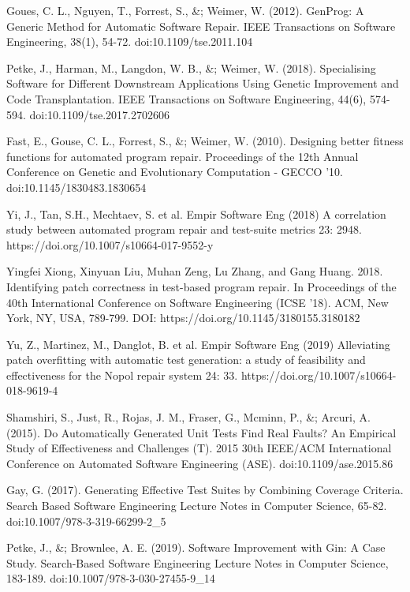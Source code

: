 \documentclass[titlepage]{article}
\begin{document}
\begin{thebibliography}{99}
Goues, C. L., Nguyen, T., Forrest, S., \&; Weimer, W. (2012). GenProg: A Generic Method for Automatic Software Repair. IEEE Transactions on Software Engineering, 38(1), 54-72. doi:10.1109/tse.2011.104

Petke, J., Harman, M., Langdon, W. B., \&; Weimer, W. (2018). Specialising Software for Different Downstream Applications Using Genetic Improvement and Code Transplantation. IEEE Transactions on Software Engineering, 44(6), 574-594. doi:10.1109/tse.2017.2702606

Fast, E., Gouse, C. L., Forrest, S., \&; Weimer, W. (2010). Designing better fitness functions for automated program repair. Proceedings of the 12th Annual Conference on Genetic and Evolutionary Computation - GECCO '10. doi:10.1145/1830483.1830654

Yi, J., Tan, S.H., Mechtaev, S. et al. Empir Software Eng (2018) A correlation study between automated program repair and test-suite metrics 23: 2948. https://doi.org/10.1007/s10664-017-9552-y

Yingfei Xiong, Xinyuan Liu, Muhan Zeng, Lu Zhang, and Gang Huang. 2018. Identifying patch correctness in test-based program repair. In Proceedings of the 40th International Conference on Software Engineering (ICSE '18). ACM, New York, NY, USA, 789-799. DOI: https://doi.org/10.1145/3180155.3180182

Yu, Z., Martinez, M., Danglot, B. et al. Empir Software Eng (2019) Alleviating patch overfitting with automatic test generation: a study of feasibility and effectiveness for the Nopol repair system 24: 33. https://doi.org/10.1007/s10664-018-9619-4

Shamshiri, S., Just, R., Rojas, J. M., Fraser, G., Mcminn, P., \&; Arcuri, A. (2015). Do Automatically Generated Unit Tests Find Real Faults? An Empirical Study of Effectiveness and Challenges (T). 2015 30th IEEE/ACM International Conference on Automated Software Engineering (ASE). doi:10.1109/ase.2015.86

Gay, G. (2017). Generating Effective Test Suites by Combining Coverage Criteria. Search Based Software Engineering Lecture Notes in Computer Science, 65-82. doi:10.1007/978-3-319-66299-2\_5

Petke, J., \&; Brownlee, A. E. (2019). Software Improvement with Gin: A Case Study. Search-Based Software Engineering Lecture Notes in Computer Science, 183-189. doi:10.1007/978-3-030-27455-9\_14


\end{thebibliography}
\end{document}
